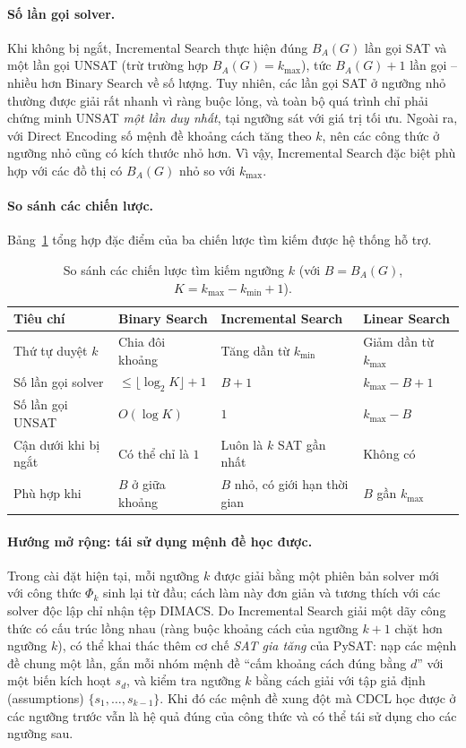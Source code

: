\documentclass[a4paper,fleqn]{cas-sc}
\begin{document}
\paragraph{Số lần gọi solver.} Khi không bị ngắt, Incremental Search thực hiện đúng $B_A(G)$ lần gọi SAT và một lần gọi UNSAT (trừ trường hợp $B_A(G) = k_{\max}$), tức $B_A(G) + 1$ lần gọi -- nhiều hơn Binary Search về số lượng. Tuy nhiên, các lần gọi SAT ở ngưỡng nhỏ thường được giải rất nhanh vì ràng buộc lỏng, và toàn bộ quá trình chỉ phải chứng minh UNSAT \emph{một lần duy nhất}, tại ngưỡng sát với giá trị tối ưu. Ngoài ra, với Direct Encoding số mệnh đề khoảng cách tăng theo $k$, nên các công thức ở ngưỡng nhỏ cũng có kích thước nhỏ hơn. Vì vậy, Incremental Search đặc biệt phù hợp với các đồ thị có $B_A(G)$ nhỏ so với $k_{\max}$.

\paragraph{So sánh các chiến lược.} Bảng~\ref{tab:search-compare} tổng hợp đặc điểm của ba chiến lược tìm kiếm được hệ thống hỗ trợ.

\begin{table}[pos=htbp]
\centering
\caption{So sánh các chiến lược tìm kiếm ngưỡng $k$ (với $B = B_A(G)$, $K = k_{\max} - k_{\min} + 1$).}
\label{tab:search-compare}
\small
\begin{tabular}{@{}llll@{}}
\toprule
Tiêu chí & Binary Search & Incremental Search & Linear Search \\
\midrule
Thứ tự duyệt $k$ & Chia đôi khoảng & Tăng dần từ $k_{\min}$ & Giảm dần từ $k_{\max}$ \\
Số lần gọi solver & $\le \lfloor \log_2 K \rfloor + 1$ & $B + 1$ & $k_{\max} - B + 1$ \\
Số lần gọi UNSAT & $O(\log K)$ & $1$ & $k_{\max} - B$ \\
Cận dưới khi bị ngắt & Có thể chỉ là $1$ & Luôn là $k$ SAT gần nhất & Không có \\
Phù hợp khi & $B$ ở giữa khoảng & $B$ nhỏ, có giới hạn thời gian & $B$ gần $k_{\max}$ \\
\bottomrule
\end{tabular}
\end{table}

\paragraph{Hướng mở rộng: tái sử dụng mệnh đề học được.} Trong cài đặt hiện tại, mỗi ngưỡng $k$ được giải bằng một phiên bản solver mới với công thức $\Phi_k$ sinh lại từ đầu; cách làm này đơn giản và tương thích với các solver độc lập chỉ nhận tệp DIMACS. Do Incremental Search giải một dãy công thức có cấu trúc lồng nhau (ràng buộc khoảng cách của ngưỡng $k + 1$ chặt hơn ngưỡng $k$), có thể khai thác thêm cơ chế \emph{SAT gia tăng} của PySAT: nạp các mệnh đề chung một lần, gắn mỗi nhóm mệnh đề ``cấm khoảng cách đúng bằng $d$'' với một biến kích hoạt $s_d$, và kiểm tra ngưỡng $k$ bằng cách giải với tập giả định (assumptions) $\{s_1, \dots, s_{k-1}\}$. Khi đó các mệnh đề xung đột mà CDCL học được ở các ngưỡng trước vẫn là hệ quả đúng của công thức và có thể tái sử dụng cho các ngưỡng sau.
\end{document}
